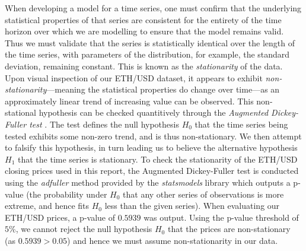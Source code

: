 \documentclass[a4paper, 11pt]{article}
\begin{document}
    When developing a model for a time series, one must confirm that the underlying statistical properties of that series are consistent for the entirety of the time horizon over which we are modelling to ensure that the model remains valid. Thus we must validate that the series is statistically identical over the length of the time series, with parameters of the distribution, for example, the standard deviation, remaining constant. This is known as the \emph{stationarity} of the data. Upon visual inspection of our ETH/USD dataset, it appears to exhibit \emph{non-stationarity}---meaning the statistical properties do change over time---as an approximately linear trend of increasing value can be observed. This non-stational hypothesis can be checked quantitively through the \emph{Augmented Dickey-Fuller test} \cite{mushtaq-2011}. The test defines the null hypothesis $H_0$ that the time series being tested exhibits some non-zero trend, and is thus non-stationary. We then attempt to falsify this hypothesis, in turn leading us to believe the alternative hypothesis $H_1$ that the time series is stationary. To check the stationarity of the ETH/USD closing prices used in this report, the Augmented Dickey-Fuller test is conducted using the \emph{adfuller} method provided by the \emph{statsmodels} library \cite{statsmodels} which outputs a p-value (the probability under $H_0$ that any other series of observations is more extreme, and hence fits $H_0$ less than the given series). When evaluating our ETH/USD prices, a p-value of $0.5939$ was output. Using the p-value threshold of $5\%$, we cannot reject the null hypothesis $H_0$ that the prices are non-stationary (as $0.5939 > 0.05$) and hence we must assume non-stationarity in our data.
\end{document}
